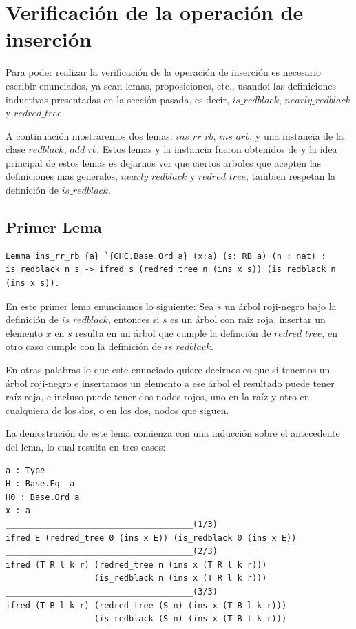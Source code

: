 \documentclass[8pt,leqno,pdflatex,spanish]{book}
\newcommand{\arn}{árbol roji-negro}
\theoremstyle{plain}
\theoremstyle{definition}
\theoremstyle{remark}
\begin{document}
\section{Verificación de la operación de inserción}

Para poder realizar la verificaci\'on de la operaci\'on de inserci\'on es necesario escribir 
enunciados, ya sean lemas, proposiciones, etc., usandoi las definiciones inductivas presentadas en 
la secci\'on pasada, es decir, $is\_redblack$, $nearly\_redblack$ y $redred\_tree$.

A continuaci\'on mostraremos dos lemas: $ins\_rr\_rb$, $ins\_arb$, y una instancia\cite{classes} 
de la clase $redblack$, $add\_rb$. Estos lemas y la instancia fueron obtenidos de \cite{MSetRBT} y 
la idea principal de estos lemas es dejarnos ver que ciertos arboles que acepten las definiciones 
mas generales, $nearly\_redblack$ y $redred\_tree$, tambien respetan la definici\'on de 
$is\_redblack$.

\subsection{Primer Lema}

\begin{verbatim}
Lemma ins_rr_rb {a} `{GHC.Base.Ord a} (x:a) (s: RB a) (n : nat) :
is_redblack n s -> ifred s (redred_tree n (ins x s)) (is_redblack n (ins x s)).
\end{verbatim}
En este primer lema enunciamos lo siguiente: Sea $s$ un {\arn} bajo la definici\'on de 
$is\_redblack$, entonces si $s$ es un \'arbol con raiz roja, insertar un elemento $x$ en $s$ 
resulta en un \'arbol que cumple la definci\'on de $redred\_tree$, en otro caso cumple con la 
definici\'on de $is\_redblack$.

En otras palabras lo que este enunciado quiere decirnos es que si tenemos un {\arn} e insertamos 
un elemento a ese \'arbol el resultado puede tener ra\'iz roja, e incluso puede tener dos nodos 
rojos, uno en la ra\'iz y otro en cualquiera de los dos, o en los dos, nodos que siguen.

La demostraci\'on de este lema comienza con una inducci\'on sobre el antecedente del lema, lo cual 
resulta en tres casos:

 \begin{verbatim}
a : Type
H : Base.Eq_ a
H0 : Base.Ord a
x : a
______________________________________(1/3)
ifred E (redred_tree 0 (ins x E)) (is_redblack 0 (ins x E))
______________________________________(2/3)
ifred (T R l k r) (redred_tree n (ins x (T R l k r))) 
                  (is_redblack n (ins x (T R l k r)))
______________________________________(3/3)
ifred (T B l k r) (redred_tree (S n) (ins x (T B l k r)))
                  (is_redblack (S n) (ins x (T B l k r)))
 \end{verbatim}
\end{document}
